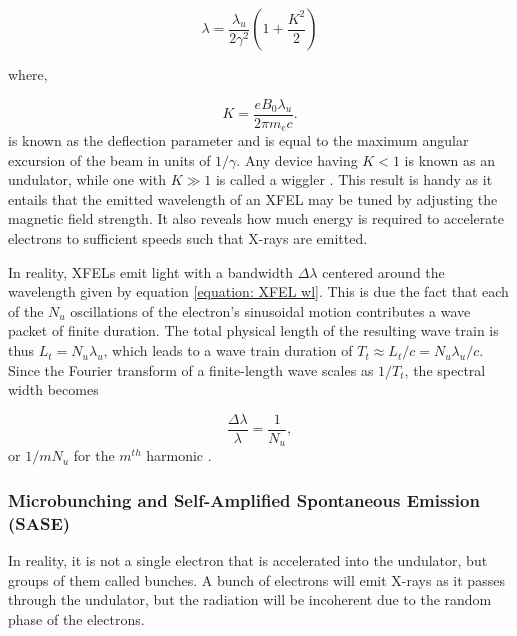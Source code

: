 \documentclass[aps,prb,twocolumn,superscriptaddress]{revtex4-2}
\begin{document}
\begin{equation}\label{equation: XFEL wl}
    \lambda = \frac{\lambda_u}{2\gamma^2}\left(1 + \frac{K^2}{2} \right)
\end{equation}

where,

\begin{equation}
    K = \frac{eB_0\lambda_u}{2\pi m_e c}.
\end{equation}
is known as the deflection parameter and is equal to the maximum angular
excursion of the beam in units of $1/\gamma$. Any device having $K < 1$ is
known as an undulator, while one with $K \gg 1$ is called a wiggler
\cite{CERN}. This result is handy as it
entails that the emitted wavelength of an XFEL may be tuned by adjusting the
magnetic field strength. It also reveals how much 
energy is required to accelerate electrons to sufficient speeds such that 
X-rays are emitted. 
    
    In reality, XFELs emit light with a bandwidth $\Delta\lambda$ centered
around the wavelength given by equation \ref{equation: XFEL wl}. This is due
the fact that each of the $N_u$ oscillations of the electron's sinusoidal motion 
contributes a wave packet of finite duration. The total physical length of the
resulting wave train is thus $L_t = N_u\lambda_u$, which leads to a wave train
duration of $T_t \approx L_t/c = N_u\lambda_u/c$. Since the Fourier transform 
of a finite-length wave scales as $1/T_t$, the spectral width becomes

\begin{equation}
    \frac{\Delta\lambda}{\lambda} = \frac{1}{N_u},
\end{equation}
or $1/mN_u$ for the $m^{th}$ harmonic \cite{CERN}.

\subsubsection{Microbunching and Self-Amplified Spontaneous Emission (SASE)}

In reality, it is not a single electron that is accelerated into the undulator,
but groups of them called bunches. A bunch of electrons will emit X-rays as it
passes through the undulator, but the radiation will be incoherent due to the
random phase of the electrons. 
\end{document}
